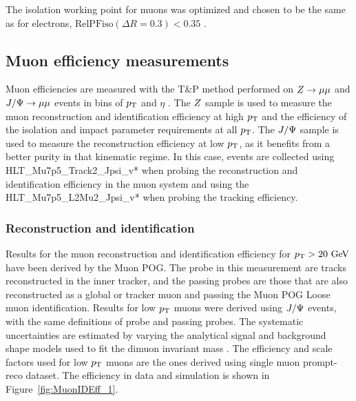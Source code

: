 The isolation working point for muons was optimized and chosen to be the same as for electrons, $\text{RelPFiso}(\Delta R = 0.3) < 0.35$ \cite{AN-15-277}. 

% 

\subsection{Muon efficiency measurements}
\label{sec:muonEffMeas}

Muon efficiencies are measured with the T\&P method performed on
$Z \to \mu\mu$ and $J/\Psi\to\mu\mu$ events in bins of $p_{\rm{T}}$ and $\eta$ \cite{AN-15-277}.
The $Z$ sample is used to measure the muon reconstruction and identification efficiency at high $p_{\rm{T}}$
and the efficiency of the isolation and impact parameter requirements at all $p_{\rm{T}}$.
The $J/\Psi$ sample is used to measure the reconstruction efficiency at low $p_{\rm{T}}$,
as it benefits from a better purity in that kinematic regime. In this case,
events are collected using HLT\_Mu7p5\_Track2\_Jpsi\_v* when probing the
reconstruction and identification efficiency in the muon system and using the
 HLT\_Mu7p5\_L2Mu2\_Jpsi\_v* when probing the tracking efficiency.

\subsubsection{Reconstruction and identification}

Results for the muon reconstruction and identification efficiency for $p_{\rm{T}} > 20\ \mathrm{Ge\kern -0.1em V}$
have been derived by the Muon POG.
The probe in this measurement are tracks reconstructed in the inner tracker, and
the passing probes are those that are also reconstructed as a global or tracker muon 
and passing the Muon POG Loose muon identification.
%
Results for low $p_{\rm{T}}$ muons were derived using $J/\Psi$ events, with the same definitions
of probe and passing probes. The systematic uncertainties are estimated by varying the analytical signal and background shape models used to fit 
the dimuon invariant mass \cite{AN-15-277}. The efficiency and scale 
factors used for low $p_{\rm{T}}$ muons are the ones derived using single muon prompt-reco dataset.
The efficiency in data and simulation is shown in Figure~\ref{fig:MuonIDEff_1}. 

